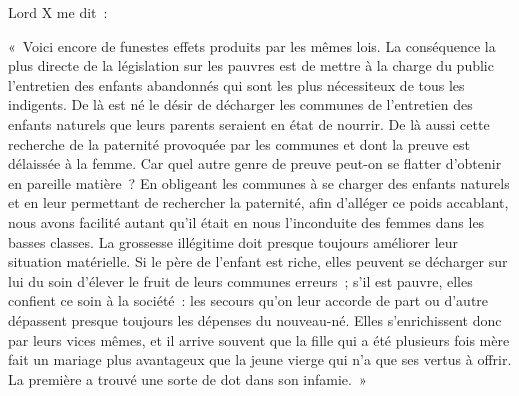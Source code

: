 \documentclass[french,twoside]{book} %
\newenvironment{quoteblock}%
  {\begin{quoting}}
  {\end{quoting}}
\newenvironment{quotebar}{%
    \def\FrameCommand{{\color{rubric!10!}\vrule width 0.5em} \hspace{0.9em}}%
    \def\OuterFrameSep{\itemsep} %
    \MakeFramed {\advance\hsize-\width \FrameRestore}
  }%
  {%
    \endMakeFramed
  }
\renewenvironment{quoteblock}%
  {%
    \savenotes
    \setstretch{0.9}
    \normalfont
    \begin{quotebar}
  }
  {%
    \end{quotebar}
    \spewnotes
  }
\begin{document}
\noindent Lord X me dit :\par

\begin{quoteblock}
 \noindent « Voici encore de funestes effets produits par les mêmes lois. La conséquence la plus directe de la législation sur les pauvres est de mettre à la charge du public l’entretien des enfants abandonnés qui sont les plus nécessiteux de tous les indigents. De là est né le désir de décharger les communes de l’entretien des enfants naturels que leurs parents seraient en état de nourrir. De là aussi cette recherche de la paternité provoquée par les communes et dont la preuve est délaissée à la femme. Car quel autre genre de preuve peut-on se flatter d’obtenir en pareille matière ? En obligeant les communes à se charger des enfants naturels et en leur permettant de rechercher la paternité, afin d’alléger ce poids accablant, nous avons facilité autant qu’il était en nous l’inconduite des femmes dans les basses classes. La grossesse illégitime doit presque toujours améliorer leur situation matérielle. Si le père de l’enfant est riche, elles peuvent se décharger sur lui du soin d’élever le fruit de leurs communes erreurs ; s’il est pauvre, elles confient ce soin à la société : les secours qu’on leur accorde de part ou d’autre dépassent presque toujours les dépenses du nouveau-né. Elles s’enrichissent donc par leurs vices mêmes, et il arrive souvent que la fille qui a été plusieurs fois mère fait un mariage plus avantageux que la jeune vierge qui n’a que ses vertus à offrir. La première a trouvé une sorte de dot dans son infamie. »
 \end{quoteblock}
\end{document}
